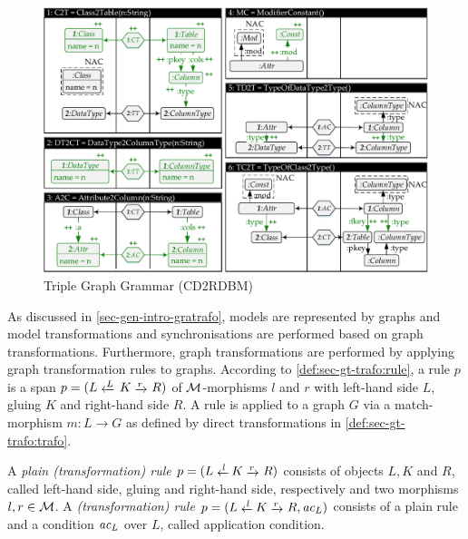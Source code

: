 \begin{figure}[!tb]
\begin{center}
\includegraphics[width=\textwidth]{img/gen_intro/tgg.pdf}
\end{center}
\caption{Triple Graph Grammar (CD2RDBM)}
\label{fig:sec-gt-trafo:tgg}
\label{fig:rules}
\end{figure}

As discussed in \cref{sec-gen-intro-gratrafo}, models are represented by graphs and model transformations and synchronisations are performed based on graph transformations.
Furthermore, graph transformations are performed by applying graph transformation rules to graphs.
According to \cref{def:sec-gt-trafo:rule}, a rule $p$ is a span $p=(L \transB{L} K \trans{r} R)$ of ${\cal M}$-morphisms $l$ and $r$ with left-hand side $L$, gluing $K$ and right-hand side $R$.
A rule is applied to a graph $G$ via a match-morphism $m\colon L \to G$ as defined by direct transformations in \cref{def:sec-gt-trafo:trafo}.

\begin{definition}
\label{def:sec-gt-trafo:rule}
A \emph{plain (transformation) rule $p=(L \transB{l} K \trans{r} R)$} consists of objects $L,K$ and $R$, called left-hand side, gluing and right-hand side, respectively and two morphisms $l,r \in {\cal M}$.
A \emph{(transformation) rule $p=(L \transB{l} K \trans{r} R, \ac_L)$} consists of a plain rule and a condition $\mathit{ac}_L$ over $L$, called application condition.
\envEndMarker
\end{definition}

